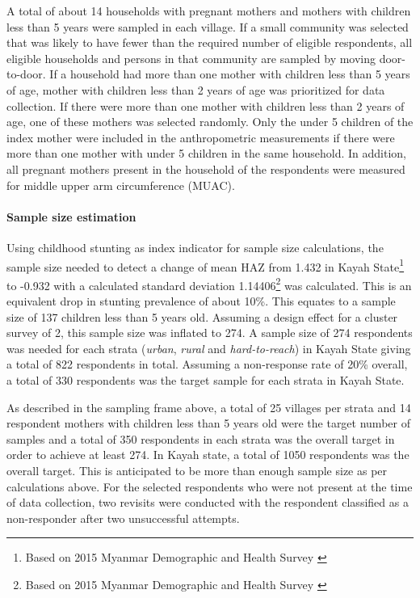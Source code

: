 \documentclass[12pt,a4paper]{article}
\let\oldparagraph\paragraph
\renewcommand{\paragraph}[1]{\oldparagraph{#1}\mbox{}}
\let\rmarkdownfootnote\footnote%
\def\footnote{\protect\rmarkdownfootnote}
\begin{document}
A total of about 14 households with pregnant mothers and mothers with children less than 5 years were sampled in each village. If a small community was selected that was likely to have fewer than the required number of eligible respondents, all eligible households and persons in that community are sampled by moving door-to-door. If a household had more than one mother with children less than 5 years of age, mother with children less than 2 years of age was prioritized for data collection. If there were more than one mother with children less than 2 years of age, one of these mothers was selected randomly. Only the under 5 children of the index mother were included in the anthropometric measurements if there were more than one mother with under 5 children in the same household. In addition, all pregnant mothers present in the household of the respondents were measured for middle upper arm circumference (MUAC).

\hypertarget{sample-size-1}{%
\paragraph{Sample size estimation}\label{sample-size-1}}

Using childhood stunting as index indicator for sample size calculations, the sample size needed to detect a change of mean HAZ from 1.432 in Kayah State\footnote{Based on 2015 Myanmar Demographic and Health Survey \citep{MinistryofHealthandSports-MoHS/Myanmar2017}} to -0.932 with a calculated standard deviation 1.14406\footnote{Based on 2015 Myanmar Demographic and Health Survey \citep{MinistryofHealthandSports-MoHS/Myanmar2017}} was calculated. This is an equivalent drop in stunting prevalence of about 10\%. This equates to a sample size of 137 children less than 5 years old. Assuming a design effect for a cluster survey of 2, this sample size was inflated to 274. A sample size of 274 respondents was needed for each strata (\emph{urban}, \emph{rural} and \emph{hard-to-reach}) in Kayah State giving a total of 822 respondents in total. Assuming a non-response rate of 20\% overall, a total of 330 respondents was the target sample for each strata in Kayah State.

As described in the sampling frame above, a total of 25 villages per strata and 14 respondent mothers with children less than 5 years old were the target number of samples and a total of 350 respondents in each strata was the overall target in order to achieve at least 274. In Kayah state, a total of 1050 respondents was the overall target. This is anticipated to be more than enough sample size as per calculations above. For the selected respondents who were not present at the time of data collection, two revisits were conducted with the respondent classified as a non-responder after two unsuccessful attempts.
\end{document}
